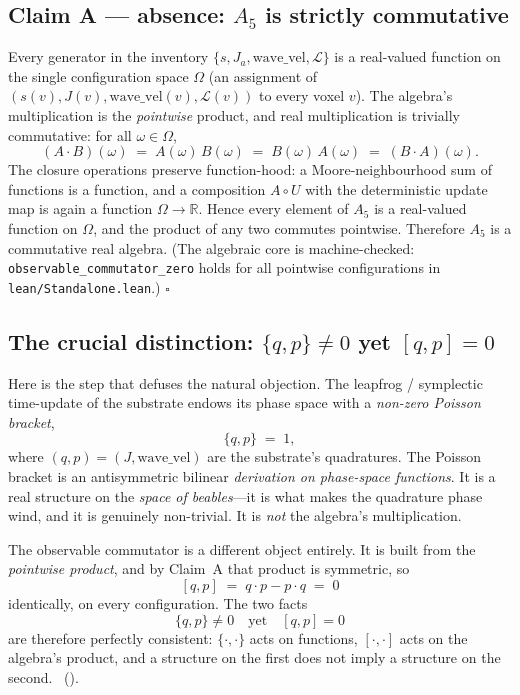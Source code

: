 \subsection*{Claim A --- absence: $A_5$ is strictly commutative}

Every generator in the inventory $\{s, J_a, \mathrm{wave\_vel}, \mathcal{L}\}$
is a real-valued function on the single configuration space $\Omega$ (an
assignment of $(s(v), J(v), \mathrm{wave\_vel}(v), \mathcal{L}(v))$ to every
voxel $v$). The algebra's multiplication is the \emph{pointwise} product, and
real multiplication is trivially commutative: for all $\omega\in\Omega$,
\[
  (A\cdot B)(\omega) \;=\; A(\omega)\,B(\omega) \;=\; B(\omega)\,A(\omega)
  \;=\; (B\cdot A)(\omega).
\]
The closure operations preserve function-hood: a Moore-neighbourhood sum of
functions is a function, and a composition $A\circ U$ with the deterministic
update map is again a function $\Omega\to\mathbb{R}$. Hence every element of
$A_5$ is a real-valued function on $\Omega$, and the product of any two commutes
pointwise. Therefore $A_5$ is a commutative real algebra. (The algebraic core is
machine-checked: \texttt{observable\_commutator\_zero} holds for all pointwise
configurations in \texttt{lean/Standalone.lean}.) \hfill$\square$

\subsection*{The crucial distinction: $\{q,p\}\neq 0$ yet $[q,p]=0$}

Here is the step that defuses the natural objection. The leapfrog / symplectic
time-update of the substrate endows its phase space with a \emph{non-zero
Poisson bracket},
\[
  \{q,p\} \;=\; 1,
\]
where $(q,p)=(J,\mathrm{wave\_vel})$ are the substrate's quadratures. The Poisson
bracket is an antisymmetric bilinear \emph{derivation on phase-space functions}.
It is a real structure on the \emph{space of beables}---it is what makes the
quadrature phase wind, and it is genuinely non-trivial. It is \emph{not} the
algebra's multiplication.

The observable commutator is a different object entirely. It is built from the
\emph{pointwise product}, and by Claim~A that product is symmetric, so
\[
  [q,p] \;=\; q\cdot p - p\cdot q \;=\; 0
\]
identically, on every configuration. The two facts
\begin{equation}\label{eq:crucial}
  \boxed{\;\{q,p\}\neq 0 \quad\text{yet}\quad [q,p]=0\;}
\end{equation}
are therefore perfectly consistent: $\{\cdot,\cdot\}$ acts on functions,
$[\cdot,\cdot]$ acts on the algebra's product, and a structure on the first does
not imply a structure on the second. ~().

